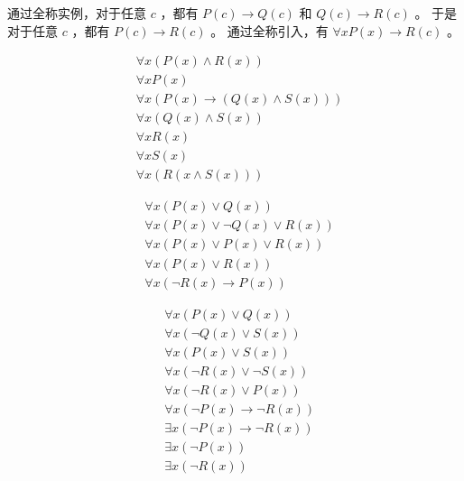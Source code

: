{{        %
        \begin{practices}
            通过全称实例，对于任意 $c$ ，都有 $P(c) \rightarrow Q(c)$ 和 $Q(c) \rightarrow R(c)$ 。
            于是对于任意 $c$ ，都有 $P(c) \rightarrow R(c)$ 。
            通过全称引入，有 $\forall x P(x) \rightarrow R(c)$ 。
        \end{practices}

        \begin{practices}
            \begin{align*}
                &\forall x (P(x) \wedge R(x)) \\
                &\forall x P(x) \\
                &\forall x (P(x) \rightarrow (Q(x) \wedge S(x))) \\
                &\forall x (Q(x) \wedge S(x)) \\
                &\forall x R(x) \\
                &\forall x S(x) \\
                &\forall x (R(x \wedge S(x)))
            \end{align*}
        \end{practices}

        \begin{practices}
            \begin{align*}
                &\forall x (P(x) \vee Q(x)) \\
                &\forall x (P(x) \vee \neg Q(x) \vee R(x)) \\
                &\forall x (P(x) \vee P(x) \vee R(x)) \\
                &\forall x (P(x) \vee R(x)) \\
                &\forall x (\neg R(x) \rightarrow P(x))
            \end{align*}
        \end{practices}

        \begin{practices}
            \begin{align*}
                &\forall x (P(x) \vee Q(x)) \\
                &\forall x (\neg Q(x) \vee S(x)) \\
                &\forall x (P(x) \vee S(x)) \\
                &\forall x (\neg R(x) \vee \neg S(x)) \\
                &\forall x (\neg R(x) \vee P(x)) \\
                &\forall x (\neg P(x) \rightarrow \neg R(x)) \\
                &\exists x (\neg P(x) \rightarrow \neg R(x)) \\
                &\exists x (\neg P(x)) \\
                &\exists x (\neg R(x))
            \end{align*}
        \end{practices}

}}
